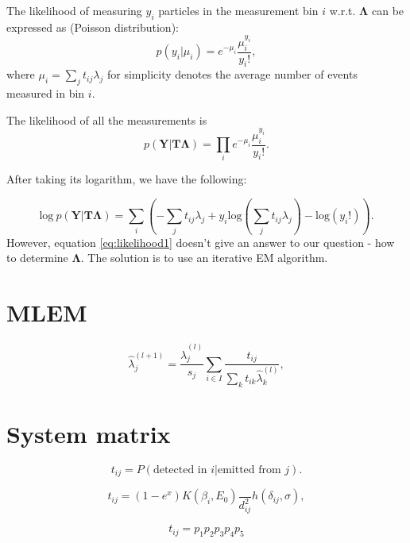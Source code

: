 The likelihood of measuring $y_{i}$ particles in the measurement bin $i$ w.r.t. $\mathbf{\Lambda}$ can be expressed as (Poisson distribution):
\begin{equation}
  p(y_{i} |\mu_{i} ) = e^{-\mu_{i}} \frac{\mu_{i}^{y_i}}{y_{i}!},
\end{equation}
where $\mu_{i} = \sum_{j} t_{ij}\lambda_{j}$ for simplicity denotes the average number of events measured in bin $i$.

The likelihood of all the measurements is
\begin{equation}  
  p(\mathbf{Y} | \mathbf{T\Lambda} ) = \prod_{i} e^{-\mu_{i}} \frac{\mu_{i}^{y_i}}{y_{i}!}.
\end{equation}

After taking its logarithm, we have the following:

\begin{equation}  
  \mathrm{log}\ p(\mathbf{Y} | \mathbf{T\Lambda} ) = \sum_{i}\left ( -\sum_{j} t_{ij}\lambda_{j} + y_{i} \mathrm{log}(\sum_{j} t_{ij}\lambda_{j})  - \mathrm{log}(y_{i}!) \right ).
  \label{eq:likelihood1}
\end{equation}
However, equation \ref{eq:likelihood1} doesn't give an answer to our question - how to determine $\mathbf{\Lambda}$. The solution is to use an iterative EM algorithm.




\section{MLEM}
\begin{equation}
\hat{\lambda}_{j}^{(l+1)} = \frac{\hat{\lambda}_{j}^{(l)}}{s_{j}} \sum_{i \in I} \frac{t_{ij}}{\sum_{k} t_{ik} \hat{\lambda}_{k}^{(l)}},
  \label{eq:MLEM}
\end{equation}

\section{System matrix}
\begin{equation}
t_{ij} =  P(\textrm{detected in } i | \textrm{emitted from } j).
\end{equation}

\begin{equation}
  t_{ij} =  (1-e^{x})  K(\beta_{i},E_{0}) \frac{}{d^{2}_{ij}} h(\delta_{ij}, \sigma),
\end{equation}


\begin{equation}
  t_{ij} =  p_{1}p_{2}p_{3}p_{4}p_{5}
\end{equation}

